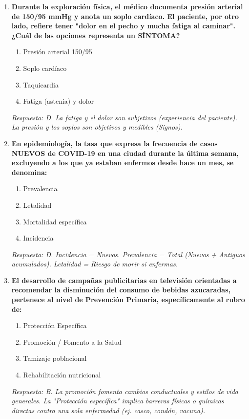 \documentclass[spanish,letterpaper,oneside]{article}
\begin{document}
\begin{enumerate}[label=\textbf{\arabic*.}]
    \item \textbf{Durante la exploración física, el médico documenta presión arterial de 150/95 mmHg y anota un soplo cardíaco. El paciente, por otro lado, refiere tener "dolor en el pecho y mucha fatiga al caminar". ¿Cuál de las opciones representa un SÍNTOMA?}
    \begin{enumerate}
        \item[A)] Presión arterial 150/95
        \item[B)] Soplo cardíaco
        \item[C)] Taquicardia
        \item[D)] Fatiga (astenia) y dolor
    \end{enumerate}
    \textit{Respuesta: D. La fatiga y el dolor son subjetivos (experiencia del paciente). La presión y los soplos son objetivos y medibles (Signos).}

    \item \textbf{En epidemiología, la tasa que expresa la frecuencia de casos NUEVOS de COVID-19 en una ciudad durante la última semana, excluyendo a los que ya estaban enfermos desde hace un mes, se denomina:}
    \begin{enumerate}
        \item[A)] Prevalencia
        \item[B)] Letalidad
        \item[C)] Mortalidad específica
        \item[D)] Incidencia
    \end{enumerate}
    \textit{Respuesta: D. Incidencia = Nuevos. Prevalencia = Total (Nuevos + Antiguos acumulados). Letalidad = Riesgo de morir si enfermas.}

    \item \textbf{El desarrollo de campañas publicitarias en televisión orientadas a recomendar la disminución del consumo de bebidas azucaradas, pertenece al nivel de Prevención Primaria, específicamente al rubro de:}
    \begin{enumerate}
        \item[A)] Protección Específica
        \item[B)] Promoción / Fomento a la Salud
        \item[C)] Tamizaje poblacional
        \item[D)] Rehabilitación nutricional
    \end{enumerate}
    \textit{Respuesta: B. La promoción fomenta cambios conductuales y estilos de vida generales. La "Protección específica" implica barreras físicas o químicas directas contra una sola enfermedad (ej. casco, condón, vacuna).}


\end{enumerate}
\end{document}
